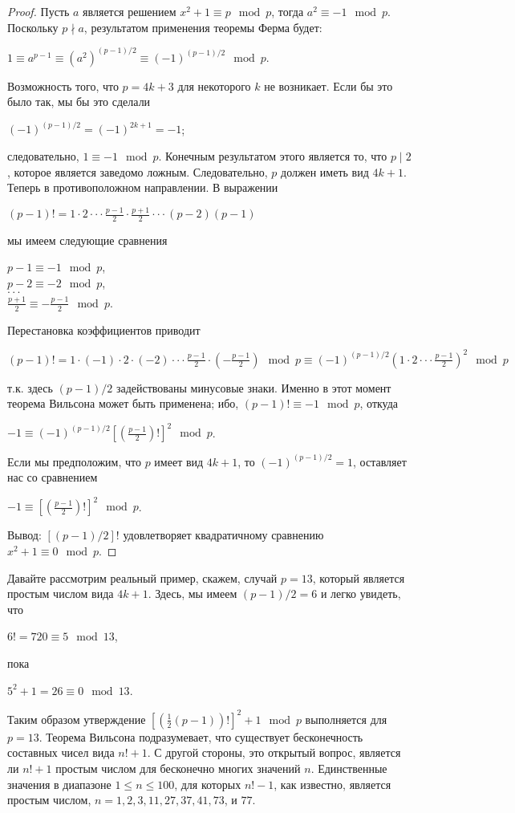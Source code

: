 \documentclass[11pt]{article}
\begin{document}
\begin{proof}
	Пусть $a$ является решением $x^2+1\equiv p\mod p$, тогда $a^2\equiv-1\mod p$. Поскольку $p\nmid a$, результатом применения теоремы Ферма будет:
	\begin{center}
		$1\equiv a^{p-1}\equiv (a^2)^{(p-1)/2}\equiv (-1)^{(p-1)/2}\mod p.$
	\end{center}
Возможность того, что $p=4k+3$ для некоторого $k$ не возникает. Если бы это было так, мы бы это сделали
\begin{center}
	$(-1)^{(p-1)/2}=(-1)^{2k+1}=-1$;
\end{center}
следовательно, $1\equiv-1\mod p$. Конечным результатом этого является то, что $p\mid2$, которое является заведомо ложным. Следовательно, $p$ должен иметь вид $4k+1$.
Теперь в противоположном направлении. В выражении
\begin{center}
	$(p-1)!=1\cdot2\cdot\cdot\cdot\frac{p-1}{2}\cdot\frac{p+1}{2}\cdot\cdot\cdot(p-2)(p-1)$
\end{center}
мы имеем следующие сравнения
\begin{center}
	$p-1\equiv-1\mod p$,
	\\$p-2\equiv-2\mod p$,
	\\$\cdot\cdot\cdot$
	\\$\frac{p+1}{2}\equiv-\frac{p-1}{2}\mod p$.
\end{center}
Перестановка коэффициентов приводит 
\begin{center}
	$(p-1)!=1\cdot(-1)\cdot2\cdot(-2)\cdot\cdot\cdot\frac{p-1}{2}\cdot(-\frac{p-1}{2})\mod p\equiv(-1)^{(p-1)/2}(1\cdot2\cdot\cdot\cdot\frac{p-1}{2})^2\mod p$
\end{center}
т.к. здесь $(p-1)/2$ задействованы минусовые знаки. Именно в этот момент теорема Вильсона может быть применена; ибо, $(p-1)!\equiv-1\mod p$, откуда 
\begin{center}
	$-1\equiv(-1)^{(p-1)/2}[(\frac{p-1}{2})!]^2\mod p$.
\end{center}
Если мы предположим, что $p$ имеет вид $4k+1$, то $(-1)^{(p-1)/2}=1$, оставляет нас со сравнением 
\begin{center}
	$-1\equiv[(\frac{p-1}{2})!]^2\mod p$.
\end{center}
Вывод: $[(p-1)/2]!$ удовлетворяет квадратичному сравнению $x^2+1\equiv 0 \mod p$.
\end{proof}
\parindent Давайте рассмотрим реальный пример, скажем, случай $p=13$, который является простым числом вида $4k+1$. Здесь, мы имеем $(p-1)/2=6$ и легко увидеть, что 
\begin{center}
	$6!=720\equiv5\mod13$,
\end{center}
пока
\begin{center}
	$5^2+1=26\equiv0\mod13$.
\end{center}
Таким образом утверждение $[(\frac{1}{2}(p-1))!]^2+1\mod p$ выполняется для $p=13$.
\parindent Теорема Вильсона подразумевает, что существует бесконечность составных чисел вида $n!+1$. С другой стороны, это открытый вопрос, является ли $n!+1$ простым числом для бесконечно многих значений $n$. Единственные значения в диапазоне $1\le n\le100$, для которых $n!-1$, как известно, является простым числом, $n=1,2,3,11,27,37,41,73$, и $77$. 
\end{document}
